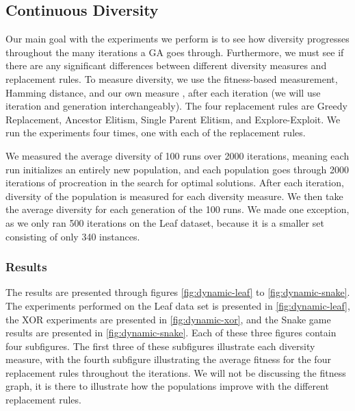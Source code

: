 \subsection{Continuous Diversity}\label{sec:continuousdiversity}
Our main goal with the experiments we perform is to see how diversity progresses throughout the many iterations a GA goes through. Furthermore, we must see if there are any significant differences between different diversity measures and replacement rules. To measure diversity, we use the fitness-based measurement, Hamming distance, and our own measure \dia, after each iteration (we will use iteration and generation interchangeably). The four replacement rules are Greedy Replacement, Ancestor Elitism, Single Parent Elitism, and Explore-Exploit. We run the experiments four times, one with each of the replacement rules.

We measured the average diversity of \num{100} runs over \num{2000} iterations, meaning each run initializes an entirely new population, and each population goes through \num{2000} iterations of procreation in the search for optimal solutions. After each iteration, diversity of the population is measured for each diversity measure. We then take the average diversity for each generation of the \num{100} runs. We made one exception, as we only ran \num{500} iterations on the Leaf dataset, because it is a smaller set consisting of only \num{340} instances.%


\subsubsection{Results}
The results are presented through figures \ref{fig:dynamic-leaf} to \ref{fig:dynamic-snake}. The experiments performed on the Leaf data set is presented in \cref{fig:dynamic-leaf}, the XOR experiments are presented in \cref{fig:dynamic-xor}, and the Snake game results are presented in \cref{fig:dynamic-snake}. Each of these three figures contain four subfigures. The first three of these subfigures illustrate each diversity measure, with the fourth subfigure illustrating the average fitness for the four replacement rules throughout the iterations. We will not be discussing the fitness graph, it is there to illustrate how the populations improve with the different replacement rules.

